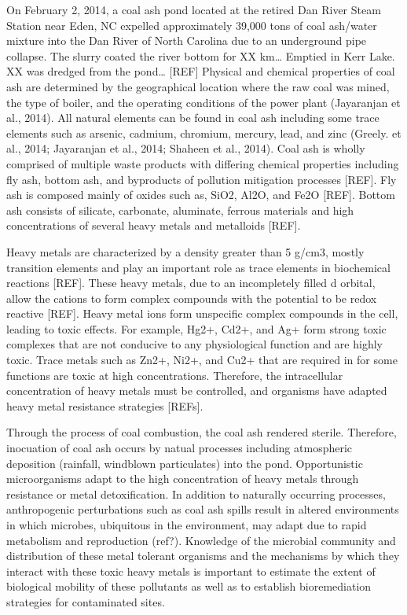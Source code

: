 \documentclass[ms]{uncgdissertationexp}
\theoremstyle{plain}
\theoremstyle{definition}
\theoremstyle{remark}
\begin{document}
  On February 2, 2014, a coal ash pond located at the retired Dan River
  Steam Station near Eden, NC expelled approximately 39,000 tons of coal
  ash/water mixture into the Dan River of North Carolina due to an
  underground pipe collapse. The slurry coated the river bottom for XX
  km\ldots{} Emptied in Kerr Lake. XX was dredged from the pond\ldots{}
  {[}REF{]} Physical and chemical properties of coal ash are determined by
  the geographical location where the raw coal was mined, the type of
  boiler, and the operating conditions of the power plant (Jayaranjan et
  al., 2014). All natural elements can be found in coal ash including some
  trace elements such as arsenic, cadmium, chromium, mercury, lead, and
  zinc (Greely. et al., 2014; Jayaranjan et al., 2014; Shaheen et al.,
  2014). Coal ash is wholly comprised of multiple waste products with
  differing chemical properties including fly ash, bottom ash, and
  byproducts of pollution mitigation processes {[}REF{]}. Fly ash is
  composed mainly of oxides such as, SiO2, Al2O, and Fe2O {[}REF{]}.
  Bottom ash consists of silicate, carbonate, aluminate, ferrous materials
  and high concentrations of several heavy metals and metalloids
  {[}REF{]}.
  
  Heavy metals are characterized by a density greater than 5 g/cm3, mostly
  transition elements and play an important role as trace elements in
  biochemical reactions {[}REF{]}. These heavy metals, due to an
  incompletely filled d orbital, allow the cations to form complex
  compounds with the potential to be redox reactive {[}REF{]}. Heavy metal
  ions form unspecific complex compounds in the cell, leading to toxic
  effects. For example, Hg2+, Cd2+, and Ag+ form strong toxic complexes
  that are not conducive to any physiological function and are highly
  toxic. Trace metals such as Zn2+, Ni2+, and Cu2+ that are required in
  for some functions are toxic at high concentrations. Therefore, the
  intracellular concentration of heavy metals must be controlled, and
  organisms have adapted heavy metal resistance strategies {[}REFs{]}.
  
  Through the process of coal combustion, the coal ash rendered sterile.
  Therefore, inocuation of coal ash occurs by natual processes including
  atmospheric deposition (rainfall, windblown particulates) into the pond.
  Opportunistic microorganisms adapt to the high concentration of heavy
  metals through resistance or metal detoxification. In addition to
  naturally occurring processes, anthropogenic perturbations such as coal
  ash spills result in altered environments in which microbes, ubiquitous
  in the environment, may adapt due to rapid metabolism and reproduction
  (ref?). Knowledge of the microbial community and distribution of these
  metal tolerant organisms and the mechanisms by which they interact with
  these toxic heavy metals is important to estimate the extent of
  biological mobility of these pollutants as well as to establish
  bioremediation strategies for contaminated sites.
  
\end{document}
